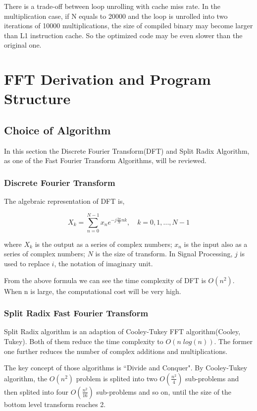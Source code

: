 \documentclass[a4paper]{report}
\begin{document}
	There is a trade-off between loop unrolling with cache miss rate. In the multiplication case, if N equals to 20000 and the loop is unrolled into two iterations of 10000 multiplications, the size of compiled binary may become larger than L1 instruction cache. So the optimized code may be even slower than the original one.

\chapter{FFT Derivation and Program Structure}

\section{Choice of Algorithm} \indent

	In this section the Discrete Fourier Transform(DFT) and Split Radix Algorithm, as one of the Fast Fourier Transform Algorithms, will be reviewed.

\subsection{Discrete Fourier Transform} \indent

	The algebraic representation of DFT is,
	
	\[X_k = \sum^{N-1}_{n=0} x_n e^{-j\frac{2\pi}{N}nk}, \quad k = 0, 1, ..., N-1\]
	
	where $X_k$ is the output as a series of complex numbers; $x_n$ is the input also as a series of complex numbers; $N$ is the size of transform. In Signal Processing, $j$ is used to replace $i$, the notation of imaginary unit.
	
	From the above formula we can see the time complexity of DFT is $O(n^2)$. When n is large, the computational cost will be very high.

\subsection{Split Radix Fast Fourier Transform} \indent

	Split Radix algorithm is an adaption of Cooley-Tukey FFT algorithm(Cooley, Tukey). Both of them reduce the time complexity to $O(n\;log(n))$. The former one further reduces the number of complex additions and multiplications.
	
	The key concept of those algorithms is ``Divide and Conquer". By Cooley-Tukey algorithm, the $O(n^2)$ problem is splited into two $O(\frac{n^2}{4})$ sub-problems and then splited into four $O(\frac{n^2}{16})$ sub-problems and so on, until the size of the bottom level transform reaches 2.
\end{document}
